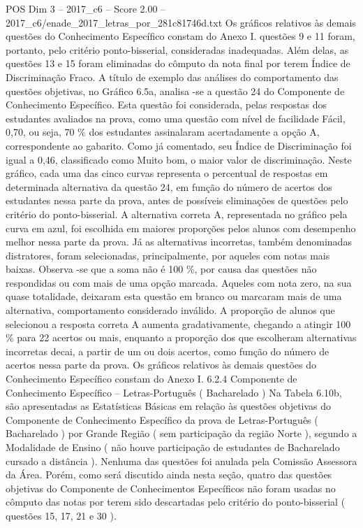 \begin{textsample}{POS Dim 3 – 2017\_c6 – Score 2.00 – 2017\_c6/enade\_2017\_letras\_por\_281c81746d.txt}
Os gráficos relativos às demais questões do Conhecimento Específico constam do Anexo I. questões 9 e 11 foram, portanto, pelo critério ponto-bisserial, consideradas inadequadas.
Além delas, as questões 13 e 15 foram eliminadas do cômputo da nota final por terem Índice de Discriminação Fraco.
A título de exemplo das análises do comportamento das questões objetivas, no Gráfico 6.5a, analisa -se a questão 24 do Componente de Conhecimento Específico.
Esta questão foi considerada, pelas respostas dos estudantes avaliados na prova, como uma questão com nível de facilidade Fácil, 0,70, ou seja, 70 \% dos estudantes assinalaram acertadamente a opção A, correspondente ao gabarito.
Como já comentado, seu Índice de Discriminação foi igual a 0,46, classificado como Muito bom, o maior valor de discriminação.
Neste gráfico, cada uma das cinco curvas representa o percentual de respostas em determinada alternativa da questão 24, em função do número de acertos dos estudantes nessa parte da prova, antes de possíveis eliminações de questões pelo critério do ponto-bisserial.
A alternativa correta A, representada no gráfico pela curva em azul, foi escolhida em maiores proporções pelos alunos com desempenho melhor nessa parte da prova.
Já as alternativas incorretas, também denominadas distratores, foram selecionadas, principalmente, por aqueles com notas mais baixas.
Observa -se que a soma não é 100 \%, por causa das questões não respondidas ou com mais de uma opção marcada.
Aqueles com nota zero, na sua quase totalidade, deixaram esta questão em branco ou marcaram mais de uma alternativa, comportamento considerado inválido.
A proporção de alunos que selecionou a resposta correta A aumenta gradativamente, chegando a atingir 100 \% para 22 acertos ou mais, enquanto a proporção dos que escolheram alternativas incorretas decai, a partir de um ou dois acertos, como função do número de acertos nessa parte da prova.
Os gráficos relativos às demais questões do Conhecimento Específico constam do Anexo I. 6.2.4 Componente de Conhecimento Específico – Letras-Português ( Bacharelado ) Na Tabela 6.10b, são apresentadas as Estatísticas Básicas em relação às questões objetivas do Componente de Conhecimento Específico da prova de Letras-Português ( Bacharelado ) por Grande Região ( sem participação da região Norte ), segundo a Modalidade de Ensino ( não houve participação de estudantes de Bacharelado cursado a distância ).
Nenhuma das questões foi anulada pela Comissão Assessora da Área.
Porém, como será discutido ainda nesta seção, quatro das questões objetivas do Componente de Conhecimentos Específicos não foram usadas no cômputo das notas por terem sido descartadas pelo critério do ponto-bisserial ( questões 15, 17, 21 e 30 ).

\end{textsample}
